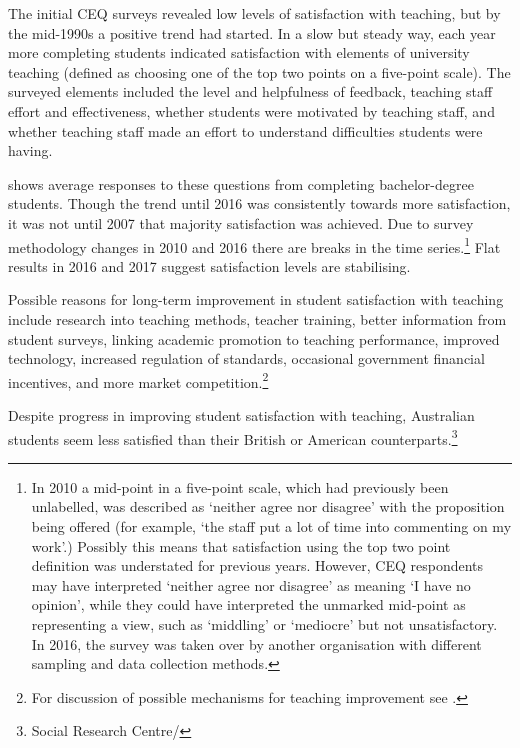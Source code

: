 \documentclass{grattan}
\begin{document}
The initial CEQ surveys revealed low levels of satisfaction with teaching, but by the mid-1990s a positive trend had started. In a slow but steady way, each year more completing students indicated satisfaction with elements of university teaching (defined as choosing one of the top two points on a five-point scale). The surveyed elements included the level and helpfulness of feedback, teaching staff effort and effectiveness, whether students were motivated by teaching staff, and whether teaching staff made an effort to understand difficulties students were having.

 shows average responses to these questions from completing bachelor-degree students. Though the trend until 2016 was consistently towards more satisfaction, it was not until 2007 that majority satisfaction was achieved. Due to survey methodology changes in 2010 and 2016 there are breaks in the time series.\footnote{In 2010 a mid-point in a five-point scale, which had previously been unlabelled, was described as `neither agree nor disagree' with the proposition being offered (for example, `the staff put a lot of time into commenting on my work'.) Possibly this means that satisfaction using the top two point definition was understated for previous years. However, CEQ respondents may have interpreted `neither agree nor disagree' as meaning `I have no opinion', while they could have interpreted the unmarked mid-point as representing a view, such as `middling' or `mediocre' but not unsatisfactory. In 2016, the survey was taken over by another organisation with different sampling and data collection methods.} Flat results in 2016 and 2017 suggest satisfaction levels are stabilising.

Possible reasons for long-term improvement in student satisfaction with teaching include research into teaching methods, teacher training, better information from student surveys, linking academic promotion to teaching performance, improved technology, increased regulation of standards, occasional government financial incentives, and more market competition.\footnote{For discussion of possible mechanisms for teaching improvement see \textcites[][chapter~6]{Norton2013takinguniversityt}[][]{Probert2015thequalityofaust}.}

Despite progress in improving student satisfaction with teaching, Australian students seem less satisfied than their British or American counterparts.\footnote{Social Research Centre/\textcites[][25]{DepartmentofEducationandTraining20182017graduateoutco}[][61]{DepartmentofEducationandTraining20182017graduateoutco}}
\end{document}
